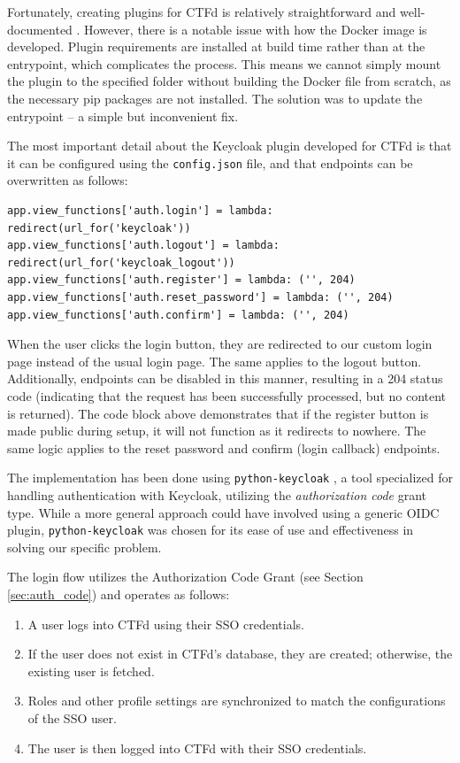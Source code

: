 Fortunately, creating plugins for CTFd is relatively straightforward and well-documented \parencite{ctfd_plugins}. However, there is a notable issue with how the Docker image is developed. Plugin requirements are installed at build time rather than at the entrypoint, which complicates the process. This means we cannot simply mount the plugin to the specified folder without building the Docker file from scratch, as the necessary pip packages are not installed. The solution was to update the entrypoint -- a simple but inconvenient fix.

The most important detail about the Keycloak plugin developed for CTFd is that it can be configured using the \texttt{config.json} file, and that endpoints can be overwritten as follows:

\begin{verbatim}
app.view_functions['auth.login'] = lambda: redirect(url_for('keycloak'))
app.view_functions['auth.logout'] = lambda: redirect(url_for('keycloak_logout'))
app.view_functions['auth.register'] = lambda: ('', 204)
app.view_functions['auth.reset_password'] = lambda: ('', 204)
app.view_functions['auth.confirm'] = lambda: ('', 204)
\end{verbatim}

When the user clicks the login button, they are redirected to our custom login page instead of the usual login page. The same applies to the logout button. Additionally, endpoints can be disabled in this manner, resulting in a 204 status code (indicating that the request has been successfully processed, but no content is returned). The code block above demonstrates that if the register button is made public during setup, it will not function as it redirects to nowhere. The same logic applies to the reset password and confirm (login callback) endpoints.

The implementation has been done using \texttt{python-keycloak} \parencite{python_keycloak}, a tool specialized for handling authentication with Keycloak, utilizing the \textit{authorization code} grant type. While a more general approach could have involved using a generic OIDC plugin, \texttt{python-keycloak} was chosen for its ease of use and effectiveness in solving our specific problem.

The login flow utilizes the Authorization Code Grant (see Section \ref{sec:auth_code}) and operates as follows:

\begin{enumerate}
    \item A user logs into CTFd using their SSO credentials.
    \item If the user does not exist in CTFd's database, they are created; otherwise, the existing user is fetched.
    \item Roles and other profile settings are synchronized to match the configurations of the SSO user.
    \item The user is then logged into CTFd with their SSO credentials.
\end{enumerate}

